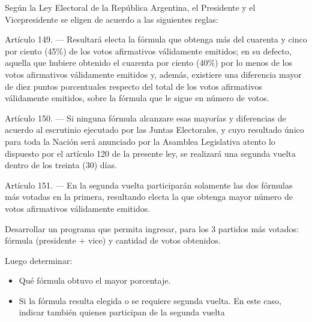 Según la Ley Electoral de la República Argentina, el Presidente y el Vicepresidente se eligen de acuerdo a las siguientes reglas:

Artículo 149. — Resultará electa la fórmula que obtenga más del cuarenta y cinco por ciento (45\%) de los votos afirmativos válidamente emitidos; en su defecto, aquella que hubiere obtenido el cuarenta por ciento (40\%) por lo menos de los votos afirmativos válidamente emitidos y, además, existiere una diferencia mayor de diez puntos porcentuales respecto del total de los votos afirmativos válidamente emitidos, sobre la fórmula que le sigue en número de votos.

Artículo 150. — Si ninguna fórmula alcanzare esas mayorías y diferencias de acuerdo al escrutinio ejecutado por las Juntas Electorales, y cuyo resultado único para toda la Nación será anunciado por la Asamblea Legislativa atento lo dispuesto por el artículo 120 de la presente ley, se realizará una segunda vuelta dentro de los treinta (30) días.

Artículo 151. — En la segunda vuelta participarán solamente las dos fórmulas más votadas en la primera, resultando electa la que obtenga mayor número de votos afirmativos válidamente emitidos.

Desarrollar un programa que permita ingresar, para los 3 partidos más votados: fórmula (presidente + vice) y cantidad de votos obtenidos.

Luego determinar:

\begin{itemize}
	\item Qué fórmula obtuvo el mayor porcentaje.
	\item Si la fórmula resulta elegida o se requiere segunda vuelta. En este caso, indicar también quienes participan de la segunda vuelta
\end{itemize}
